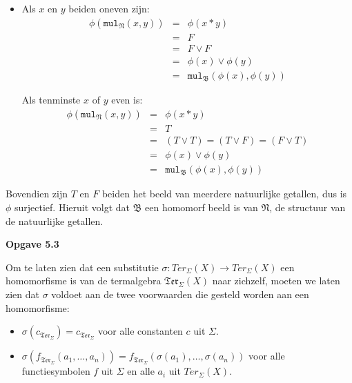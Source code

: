 \documentclass[a4paper,11pt]{article}
\begin{document}
\begin{enumerate}
\begin{itemize}
\item
Als $x$ en $y$ beiden oneven zijn:
\begin{eqnarray*}
\phi(\texttt{mul}_{\mathfrak{N}}(x,y)) & = & \phi(x*y) \\
                                       & = & F \\
                                       & = & F \vee F \\
                                       & = & \phi(x) \vee \phi(y) \\
                                       & = & \texttt{mul}_{\mathfrak{B}}(\phi(x),\phi(y))
\end{eqnarray*}

Als tenminste $x$ of $y$ even is:
\begin{eqnarray*}
\phi(\texttt{mul}_{\mathfrak{N}}(x,y)) & = & \phi(x*y) \\
                                       & = & T \\
                                       & = & (T \vee T) = (T \vee F) = (F \vee T) \\
                                       & = & \phi(x) \vee \phi(y) \\
                                       & = & \texttt{mul}_{\mathfrak{B}}(\phi(x),\phi(y))
\end{eqnarray*}

\end{itemize}

Bovendien zijn $T$ en $F$ beiden het beeld van meerdere natuurlijke getallen,
dus is $\phi$ surjectief. Hieruit volgt dat $\mathfrak{B}$ een homomorf beeld
is van $\mathfrak{N}$, de structuur van de natuurlijke getallen.\\[2em]

\end{enumerate}


{\bf Opgave 5.3}

Om te laten zien dat een substitutie $\sigma : Ter_{\Sigma}(X) \rightarrow
Ter_{\Sigma}(X)$ een homomorfisme is van de termalgebra
$\mathfrak{Ter}_{\Sigma}(X)$ naar zichzelf, moeten we laten zien dat $\sigma$
voldoet aan de twee voorwaarden die gesteld worden aan een homomorfisme:

\begin{itemize}

\item
$\sigma(c_{\mathfrak{Ter}_{\Sigma}}) = c_{\mathfrak{Ter}_{\Sigma}}$ voor alle
  constanten $c$ uit $\Sigma$.

\item
$\sigma(f_{\mathfrak{Ter}_{\Sigma}}(a_{1}, \ldots, a_{n}))
= f_{\mathfrak{Ter}_{\Sigma}}(\sigma(a_{1}), \ldots, \sigma(a_{n}))$ voor alle
functiesymbolen $f$ uit $\Sigma$ en alle $a_{i}$ uit $Ter_{\Sigma}(X)$.

\end{itemize}
\end{document}
